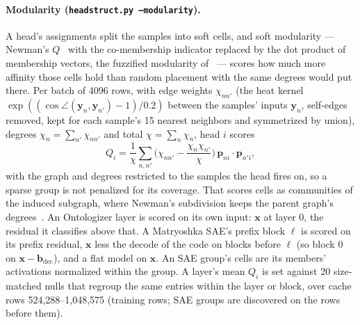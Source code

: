 \paragraph{Modularity (\texttt{headstruct.py --modularity}).}
A head's assignments split the samples into soft cells, and soft
modularity --- Newman's $Q$~\cite{newman2006} with the co-membership
indicator replaced by the dot product of membership vectors, the fuzzified
modularity of~\cite[Eq.~14]{nepusz2008} --- scores how much more affinity
those cells hold than random placement with the same degrees would put
there.
Per batch of 4096 rows, with edge weights $\chi_{nn'}$ (the heat kernel
$\exp((\cos\angle(\mathbf{y}_n, \mathbf{y}_{n'})-1)/0.2)$ between the
samples' inputs $\mathbf{y}_n$, self-edges removed,
kept for each sample's 15 nearest neighbors and symmetrized by union),
degrees $\chi_n = \sum_{n'}\chi_{nn'}$ and total $\chi = \sum_n\chi_n$,
head $i$ scores
\begin{equation}
	Q_i = \frac{1}{\chi}\sum_{n,n'}\Big(\chi_{nn'}
	- \frac{\chi_n\chi_{n'}}{\chi}\Big)\,
	\mathbf{p}_{ni}\cdot\mathbf{p}_{n'i},
	\label{eq:modularity}
\end{equation}
with the graph and degrees restricted to the samples the head fires on, so
a sparse group is not penalized for its coverage. That scores cells as
communities of the induced subgraph, where Newman's subdivision keeps the
parent graph's degrees~\cite{newman2006}. An Ontologizer layer is
scored on its own input: $\mathbf{x}$ at layer 0, the residual it
classifies above that. A Matryoshka SAE's prefix block $\ell$ is scored on
its prefix residual, $\mathbf{x}$ less the decode of the code on blocks
before $\ell$ (so block 0 on $\mathbf{x}-\mathbf{b}_{\mathrm{dec}}$), and a
flat model on $\mathbf{x}$. An SAE group's cells are its members'
activations normalized within the group. A layer's mean $Q_i$ is set
against 20 size-matched nulls that regroup the same entries within the
layer or block, over cache rows 524{,}288--1{,}048{,}575 (training rows;
SAE groups are discovered on the rows before them).

